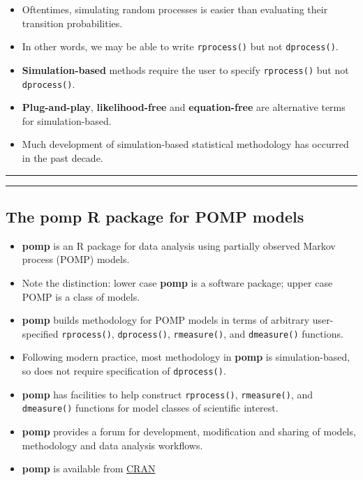 \documentclass[]{article}
\begin{document}
\begin{itemize}
\item
  Oftentimes, simulating random processes is easier than evaluating
  their transition probabilities.
\item
  In other words, we may be able to write \texttt{rprocess()} but not
  \texttt{dprocess()}.
\item
  \textbf{Simulation-based} methods require the user to specify
  \texttt{rprocess()} but not \texttt{dprocess()}.
\item
  \textbf{Plug-and-play}, \textbf{likelihood-free} and
  \textbf{equation-free} are alternative terms for simulation-based.
\item
  Much development of simulation-based statistical methodology has
  occurred in the past decade.
\end{itemize}

\begin{center}\rule{0.5\linewidth}{\linethickness}\end{center}

\begin{center}\rule{0.5\linewidth}{\linethickness}\end{center}

\subsection{\texorpdfstring{The \textbf{pomp} \textbf{R} package for
POMP
models}{The pomp R package for POMP models}}\label{the-pomp-r-package-for-pomp-models}

\begin{itemize}
\item
  \textbf{pomp} is an R package for data analysis using partially
  observed Markov process (POMP) models.
\item
  Note the distinction: lower case \textbf{pomp} is a software package;
  upper case POMP is a class of models.
\item
  \textbf{pomp} builds methodology for POMP models in terms of arbitrary
  user-specified \texttt{rprocess()}, \texttt{dprocess()},
  \texttt{rmeasure()}, and \texttt{dmeasure()} functions.
\item
  Following modern practice, most methodology in \textbf{pomp} is
  simulation-based, so does not require specification of
  \texttt{dprocess()}.
\item
  \textbf{pomp} has facilities to help construct \texttt{rprocess()},
  \texttt{rmeasure()}, and \texttt{dmeasure()} functions for model
  classes of scientific interest.
\item
  \textbf{pomp} provides a forum for development, modification and
  sharing of models, methodology and data analysis workflows.
\item
  \textbf{pomp} is available from
  \href{https://cran.r-project.org/web/packages/pomp/index.html}{CRAN}
\end{itemize}
\end{document}
